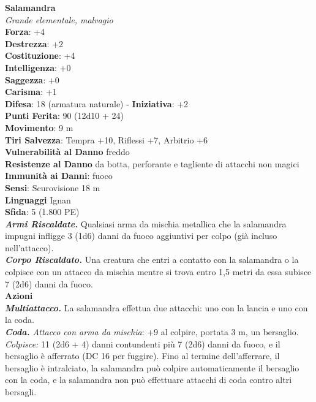 \begin{multicols}{2}
\medskip\textbf{Salamandra}\\
\emph{Grande elementale, malvagio}\\
\textbf{Forza}: +4\\
\textbf{Destrezza}: +2\\
\textbf{Costituzione}: +4\\
\textbf{Intelligenza}: +0\\
\textbf{Saggezza}: +0\\
\textbf{Carisma}: +1\\
\textbf{Difesa}: 18 (armatura naturale) - \textbf{Iniziativa}: +2\\
\textbf{Punti Ferita}: 90 (12d10 + 24)\\
\textbf{Movimento}: 9 m\\
\textbf{Tiri Salvezza}: Tempra +10, Riflessi +7, Arbitrio +6\\
\textbf{Vulnerabilità al Danno} freddo\\
\textbf{Resistenze al Danno} da botta, perforante e tagliente di attacchi non magici\\
\textbf{Immunità ai Danni}: fuoco\\
\textbf{Sensi}: Scurovisione 18 m\\
\textbf{Linguaggi} Ignan\\
\textbf{Sfida}: 5 (1.800 PE)\smallskip\\
\emph{\textbf{Armi Riscaldate.}} Qualsiasi arma da mischia metallica che la salamandra impugni infligge 3 (1d6) danni da fuoco aggiuntivi per colpo (già incluso nell'attacco).\\
\emph{\textbf{Corpo Riscaldato.}} Una creatura che entri a contatto con la salamandra o la colpisce con un attacco da mischia mentre si trova entro 1,5 metri da essa subisce 7 (2d6) danni da fuoco.\\
\smallskip\textbf{Azioni}\\
\emph{\textbf{Multiattacco.}} La salamandra effettua due attacchi: uno con la lancia e uno con la coda.\\
\emph{\textbf{Coda.} Attacco con arma da mischia}: +9 al colpire, portata 3 m, un bersaglio.\\
\emph{Colpisce:} 11 (2d6 + 4) danni contundenti più 7 (2d6) danni da fuoco, e il bersaglio è afferrato (DC  16 per fuggire). Fino al termine dell'afferrare, il bersaglio è intralciato, la salamandra può colpire automaticamente il bersaglio con la coda, e la salamandra non può effettuare attacchi di coda contro altri bersagli.\\

\end{multicols}
